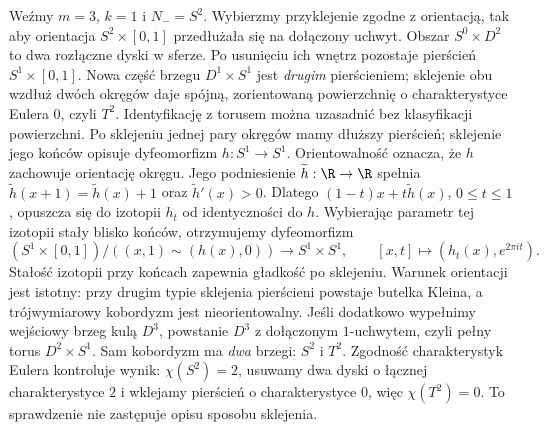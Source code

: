 \begin{przyklad}
\label{prz:sfera-torus-chirurgia-18}
Weźmy $m=3$, $k=1$ i $N_-=S^2$.
Wybierzmy przyklejenie zgodne z orientacją,
tak aby orientacja $S^2\times[0,1]$ przedłużała się
na dołączony uchwyt.
Obszar $S^0\times D^2$ to dwa rozłączne
dyski w sferze. Po usunięciu ich wnętrz
pozostaje pierścień $S^1\times[0,1]$.
Nowa część brzegu $D^1\times S^1$
jest \emph{drugim} pierścieniem; sklejenie
obu wzdłuż dwóch okręgów daje spójną, zorientowaną
powierzchnię o charakterystyce Eulera $0$, czyli $T^2$.
Identyfikację z torusem można uzasadnić bez klasyfikacji powierzchni.
Po sklejeniu jednej pary okręgów mamy dłuższy pierścień;
sklejenie jego końców opisuje dyfeomorfizm $h:S^1\to S^1$.
Orientowalność oznacza, że $h$ zachowuje orientację okręgu.
Jego podniesienie $\widetilde h:\R\to\R$ spełnia
$\widetilde h(x+1)=\widetilde h(x)+1$ oraz $\widetilde h'(x)>0$.
Dlatego $(1-t)x+t\widetilde h(x)$, $0\leq t\leq1$,
opuszcza się do izotopii $h_t$ od identyczności do $h$.
Wybierając parametr tej izotopii stały blisko końców,
otrzymujemy dyfeomorfizm
\[
 (S^1\times[0,1])/((x,1)\sim(h(x),0))\longrightarrow S^1\times S^1,
 \qquad [x,t]\longmapsto(h_t(x),e^{2\pi it}).
\]
Stałość izotopii przy końcach zapewnia gładkość po sklejeniu.
Warunek orientacji jest istotny: przy drugim typie
sklejenia pierścieni powstaje butelka Kleina,
a trójwymiarowy kobordyzm jest nieorientowalny.
Jeśli dodatkowo wypełnimy wejściowy brzeg
kulą $D^3$, powstanie $D^3$ z dołączonym
$1$-uchwytem, czyli pełny torus $D^2\times S^1$.
Sam kobordyzm ma \emph{dwa} brzegi: $S^2$ i $T^2$.
Zgodność charakterystyk Eulera kontroluje
wynik: $\chi(S^2)=2$, usuwamy dwa dyski
o łącznej charakterystyce $2$ i wklejamy
pierścień o charakterystyce $0$, więc
$\chi(T^2)=0$. To sprawdzenie nie zastępuje
opisu sposobu sklejenia.
\end{przyklad}

